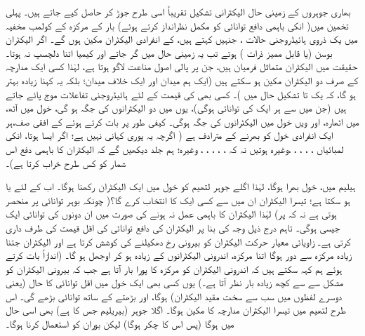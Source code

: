 بھاری جوہروں کے زمینی حال الیکٹرانی تشکیل تقریباً اسی طرح جوڑ کر حاصل کیے جاتے ہیں۔ پہلی تخمین میں( انکی باہمی دافع توانائی کو مکمل نظرانداز کرتے ہوئے) بار  کے مرکزہ کے کولمب مخفیہ میں یک ذروی ہائیڈروجنی حالات ، جنہیں  کہتے ہیں، کے انفرادی الیکٹران مکین ہوں گے۔ اگر الیکٹران بوسن (یا قابل ممیز ذرات ) ہوتے تب یہ زمینی حال  میں گر جاتے اور کیمیا اتنا دلچسپ نہ ہوتا۔ حقیقت میں الیکٹران متماثل فرمیان ہیں، جن پر پالی اصول مناعت لاگو ہوتا ہے، لہٰذا کسی ایک مدارچہ کے صرف دو الیکٹران مکین ہو سکتے ہیں (ایک ہم میدان اور ایک خلاف میدان؛ بلکہ یہ کہنا زیادہ بہتر ہو گا، کہ یک تا تشکیل حال میں )۔ کسی بھی  کی قیمت کے لئے  ہائیڈروجنی تفاعلات موج پائے جاتے ہیں (جن میں سے ہر ایک کی توانائی  ہوگی)، یوں   میں دو الیکٹرانوں کی جگہ ہو گی،  خول میں آٹھ،  میں اٹھارہ، اور ویں خول میں  الیکٹرانوں کی جگہ ہوگی۔ کیفی طور پر بات کرتے ہوئے  کے افقی صف،ہر ایک انفرادی خول کو بھرنے کے مترادف ہے ( اگرچہ یہ پوری کہانی نہیں ہے؛ اگر ایسا ہوتا، انکی لمبائیاں ، ، ، ، ،وغیرہ ہوتیں نہ کہ ، ، ، ، ، وغیرہ؛ ہم جلد دیکھیں گے کہ الیکٹران کا باہمی دفع اس شمار کو کس طرح خراب کرتا ہے)۔

ہیلیم میں،  خول بھرا ہوگا، لہٰذا اگلے جوہر لتھیم  کو  خول میں ایک الیکٹران رکھنا ہوگا۔ اب  کے لئے  یا  ہو سکتا ہے؛ تیسرا الیکٹران ان میں سے کسی ایک کا انتخاب کرے گا؟( چونکہ بوہر توانائی  پر منحصر ہوتی ہے نہ کہ  پر) لہٰذا الیکٹران کا باہمی عمل نہ ہونے کی صورت میں ان دونوں کی توانائی ایک جیسی ہوگی۔ تاہم درج ذیل وجہ کی بنا پر الیکٹران کی دافع توانائی  کی اقل قیمت کی طرف داری کرتی ہے۔ زاویائی معیار حرکت الیکٹران کو بیرونی رخ دھکیلنے کی کوشش کرتا ہے اور الیکٹران جتنا زیادہ مرکزہ سے دور ہوگا اتنا مرکزہ، اندرونی الیکٹرانوں کے زیادہ  ہو کر اوجھل ہو گا۔ (اندازاً بات کرتے ہوئے ہم کہہ سکتے ہیں کہ اندرونی الیکٹران کو مرکزہ کا پورا بار   آتا ہے جب کہ بیرونی الیکٹران کو مشکل سے  سے کچھ زیادہ بار نظر آتا ہے۔) یوں کسی بھی ایک خول میں اقل توانائی کا حال (یعنی دوسرے لفظوں میں سب سے سخت مقید الیکٹران)  ہوگا، اور بڑھتے  کے ساتھ توانائی بڑھے گی۔ اس طرح لتھیم میں تیسرا الیکٹران مدارچہ  کا مکین ہوگا۔ اگلا جوہر (بیریلیم جس کا  ہے) بھی اسی حال میں ہوگا (پس اس کا چکر  ہوگا) لیکن بوران  کو  استعمال کرنا ہوگا۔ 
 
